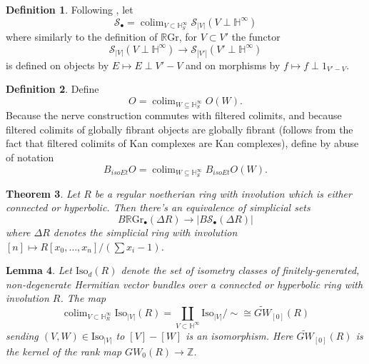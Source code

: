 \documentclass[edeposit,fullpage]{uiucthesis2009}
\newcommand{\Z}{\mathbb Z}
\newcommand{\mbb}{\mathbb}
\newcommand{\mc}{\mathcal}
\newcommand{\RGr}{\mathbb R\mathrm{Gr}}
\newcommand{\Iso}{\mathrm{Iso}}
\DeclareMathOperator*{\colim}{colim}
\theoremstyle{plain}
\newtheorem{lemma}{Lemma}
\numberwithin{lemma}{section}
\newtheorem{theorem}[lemma]{Theorem}
\theoremstyle{definition}
\newtheorem{definition}[lemma]{Definition}
\begin{document}
\begin{definition}
Following \cite{SchTri}, let
\[
\mc S_\bullet = \colim_{V \subset \mbb H^\infty_S} \mc S_{|V|}(V \perp
\mbb H^\infty)
\]
where similarly to the definition of $\RGr$, for $V \subset V'$ the
functor 
\[
\mc S_{|V|}(V \perp
\mbb H^\infty) \rightarrow \mc S_{|V'|}(V' \perp
\mbb H^\infty)
\]
is defined on objects by $E \mapsto E \perp V'-V$ and on morphisms by
$f \mapsto f \perp 1_{V'-V}$. 
\end{definition}

\begin{definition}
Define
\[
O = \colim_{W \subseteq \mbb H^\infty_S} O(W).
\]
Because the nerve construction commutes with filtered colimits, and
because filtered colimits of globally fibrant objects are globally
fibrant (follows from the fact that filtered colimits of Kan complexes
are Kan complexes), define by abuse of notation
\[
B_{isoEt}O = \colim_{W \subseteq \mbb H^\infty_S} B_{isoEt}O(W).
\]
\end{definition}

\begin{theorem}
Let $R$ be a regular noetherian ring with involution which is either connected or
hyperbolic. Then there's an equivalence of simplicial sets
\[
B\RGr_\bullet(\Delta R) \rightarrow |B \mc S_\bullet (\Delta R)|
\]
where $\Delta R$ denotes the simplicial ring with involution $[n] \mapsto
R[x_0,\dots,x_n]/(\sum x_i -1)$. 
\end{theorem}


\begin{lemma}
Let $\Iso_d(R)$ denote the set of isometry classes of finitely-generated, non-degenerate
Hermitian vector bundles over a connected or hyperbolic ring with
involution $R$. The map
\[
\colim_{V \subset \mbb H^\infty_R} \Iso_{|V|}(R) = \coprod_{V \subset
  \mbb H^\infty} \Iso_{|V|}/\sim \cong \widetilde{GW}_{[0]}(R)
\]
sending $(V,W) \in \Iso_{|V|}$ to $[V] - [W]$ is an isomorphism. 
Here $\widetilde{GW}_{[0]}(R)$ is the kernel of the rank map $GW_0(R)
\rightarrow \Z$.
\end{lemma}
\end{document}
